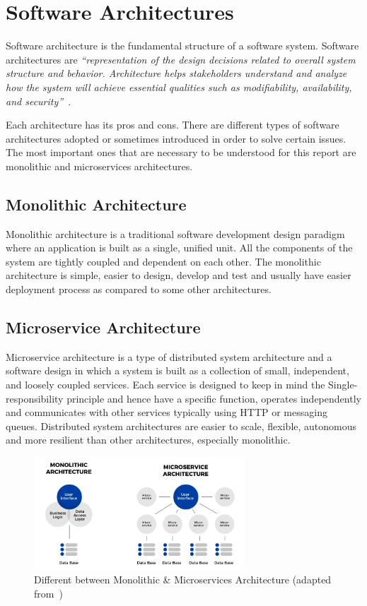 \section{Software Architectures}
Software architecture is the fundamental structure of a software system. Software architectures are \textit{``representation of the design decisions related to overall system structure and behavior. Architecture helps stakeholders understand and analyze how the system will achieve essential qualities such as modifiability, availability, and security''}~\citep{sei_software_architecture}.

Each architecture has its pros and cons. There are different types of software architectures adopted or sometimes introduced in order to solve certain issues. The most important ones that are necessary to be understood for this report are monolithic and microservices architectures.

\subsection{Monolithic Architecture}
Monolithic architecture is a traditional software development design paradigm where an application is built as a single, unified unit. All the components of the system are tightly coupled and dependent on each other. The monolithic architecture is simple, easier to design, develop and test and usually have easier deployment process as compared to some other architectures.

\subsection{Microservice Architecture}
Microservice architecture is a type of distributed system architecture and a software design in which a system is built as a collection of small, independent, and loosely coupled services. Each service is designed to keep in mind the Single-responsibility principle and hence have a specific function, operates independently and communicates with other services typically using HTTP or messaging queues. Distributed system architectures are easier to scale, flexible, autonomous and more resilient than other architectures, especially monolithic. 

\begin{figure}[H]
    \centering
    \includegraphics[width=0.7\textwidth]{figures/monolithic_microservices.png}
    \caption[Different between Monolithic \& Microservices Architecture]{Different between Monolithic \& Microservices Architecture (adapted from~\citep{atlassian_microservices_vs_monolith})}
	\label{fig_background_monolithic_microservices}
\end{figure}

